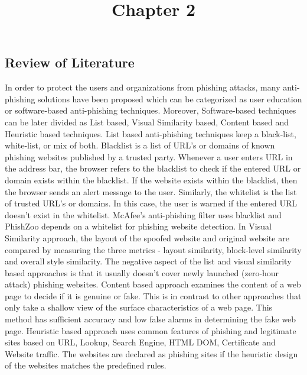 \documentclass[12pt]{article}
\title{\textbf{Chapter 2}\vspace{-6ex}}
\begin{document}
\maketitle

\setcounter{page}{5}

\begin{center}
\section{Review of Literature}
\end{center}
In order to protect the users and organizations from phishing attacks, many anti-phishing solutions have been proposed which can be categorized as user education or software-based anti-phishing techniques. Moreover, Software-based techniques can be later divided as List based, Visual Similarity based, Content based and Heuristic based techniques. \newline\newline
List based anti-phishing techniques keep a black-list, white-list, or mix of both. Blacklist is a list of URL’s or domains of known phishing websites published by a trusted party. Whenever a user enters URL in the address bar, the browser refers to the blacklist to check if the entered URL or domain exists within the blacklist. If the website exists within the blacklist, then the browser sends an alert message to the user. Similarly, the whitelist is the list of trusted URL’s or domains. In this case, the user is warned if the entered URL doesn’t exist in the whitelist. McAfee’s anti-phishing filter uses blacklist and PhishZoo depends on a whitelist for phishing website detection. \newline\newline
In Visual Similarity approach, the layout of the spoofed website and original website are compared by measuring the three metrics - layout similarity, block-level similarity and overall style similarity. The negative aspect of the list and visual similarity based approaches is that it usually doesn’t cover newly launched (zero-hour attack) phishing websites.\newline\newline 
Content based approach examines the content of a web page to decide if it is genuine or fake. This is in contrast to other approaches that only take a shallow view of the surface characteristics of a web page. This method has sufficient accuracy and low false alarms in determining the fake web page. Heuristic based approach uses common features of phishing and legitimate sites based on URL, Lookup, Search Engine, HTML DOM, Certificate and Website traffic. The websites are declared as phishing sites if the heuristic design of the websites matches the predefined rules. 
\pagestyle{fancy}
\fancyhf{}
\renewcommand{\headrulewidth}{0pt}
\cfoot{\thepage}
\end{document}
